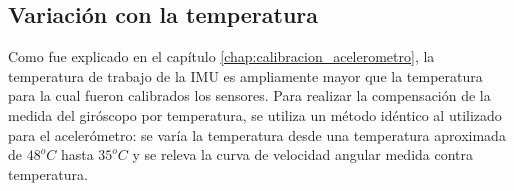 \documentclass[main]{subfiles}
\begin{document}
\subsection{Variación con la temperatura}

Como fue explicado en el capítulo \ref{chap:calibracion_acelerometro}, la temperatura de trabajo de la IMU es ampliamente mayor que la temperatura para la cual fueron calibrados los sensores. Para realizar la compensación de la medida del giróscopo por temperatura, se utiliza un método idéntico al utilizado para el acelerómetro: se varía la temperatura desde una temperatura aproximada de $48^oC$ hasta $35^oC$ y se releva la curva de velocidad angular medida contra temperatura.
\end{document}
